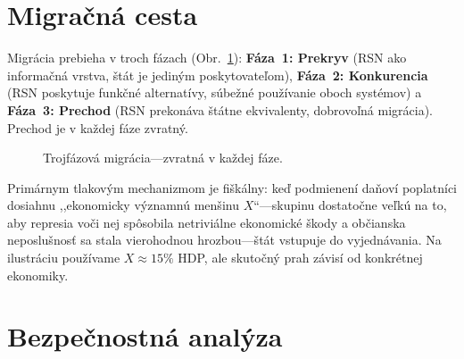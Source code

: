 \documentclass[11pt,a4paper,twocolumn]{article}
\begin{document}
\section{Migračná cesta}

Migrácia prebieha v troch fázach (Obr.~\ref{fig:migration}): \textbf{Fáza~1: Prekryv} (RSN ako informačná vrstva, štát je jediným poskytovateľom), \textbf{Fáza~2: Konkurencia} (RSN poskytuje funkčné alternatívy, súbežné používanie oboch systémov) a \textbf{Fáza~3: Prechod} (RSN prekonáva štátne ekvivalenty, dobrovoľná migrácia). Prechod je v každej fáze zvratný.

\begin{figure}[ht]
\centering
{}
\caption{Trojfázová migrácia---zvratná v každej fáze.}
\label{fig:migration}
\end{figure}

Primárnym tlakovým mechanizmom je fiškálny: keď podmienení daňoví poplatníci dosiahnu ,,ekonomicky významnú menšinu $X$``---skupinu dostatočne veľkú na to, aby represia voči nej spôsobila netriviálne ekonomické škody a občianska neposlušnosť sa stala vierohodnou hrozbou---štát vstupuje do vyjednávania. Na ilustráciu používame $X \approx 15\%$ HDP, ale skutočný prah závisí od konkrétnej ekonomiky.

\section{Bezpečnostná analýza}
\end{document}
